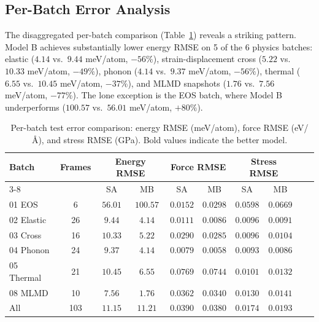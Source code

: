 \documentclass[twoside,prb,aps,floatfix,superscriptaddress,longbibliography]{revtex4-2}
\begin{document}
\subsection{Per-Batch Error Analysis}
\label{sec:perbatch}

The disaggregated per-batch comparison (Table~\ref{tab:perbatch}) reveals a striking pattern. Model B achieves substantially lower energy RMSE on 5 of the 6 physics batches: elastic ($4.14$ vs.\ $9.44$ meV/atom, $-56\%$), strain-displacement cross ($5.22$ vs.\ $10.33$ meV/atom, $-49\%$), phonon ($4.14$ vs.\ $9.37$ meV/atom, $-56\%$), thermal ($6.55$ vs.\ $10.45$ meV/atom, $-37\%$), and MLMD snapshots ($1.76$ vs.\ $7.56$ meV/atom, $-77\%$). The lone exception is the EOS batch, where Model B underperforms ($100.57$ vs.\ $56.01$ meV/atom, $+80\%$).

\begin{table}[t]
\caption{Per-batch test error comparison: energy RMSE (meV/atom), force RMSE (eV/{\AA}), and stress RMSE (GPa). Bold values indicate the better model.}
\label{tab:perbatch}
\begin{ruledtabular}
\begin{tabular}{lccccccccc}
\toprule
Batch & \multirow{2}{*}{Frames} & \multicolumn{2}{c}{Energy RMSE} & \multicolumn{2}{c}{Force RMSE} & \multicolumn{2}{c}{Stress RMSE} \\
\cmidrule{3-8}
& & SA & MB & SA & MB & SA & MB \\
\midrule
01 EOS & 6 & $56.01$ & $100.57$ & $0.0152$ & $0.0298$ & $0.0598$ & $0.0669$ \\
02 Elastic & 26 & $9.44$ & $\mathbf{4.14}$ & $0.0111$ & $\mathbf{0.0086}$ & $\mathbf{0.0096}$ & $0.0091$ \\
03 Cross & 16 & $10.33$ & $\mathbf{5.22}$ & $0.0290$ & $\mathbf{0.0285}$ & $\mathbf{0.0096}$ & $0.0104$ \\
04 Phonon & 24 & $9.37$ & $\mathbf{4.14}$ & $0.0079$ & $\mathbf{0.0058}$ & $\mathbf{0.0093}$ & $0.0086$ \\
05 Thermal & 21 & $10.45$ & $\mathbf{6.55}$ & $0.0769$ & $\mathbf{0.0744}$ & $\mathbf{0.0101}$ & $0.0132$ \\
08 MLMD & 10 & $7.56$ & $\mathbf{1.76}$ & $0.0362$ & $\mathbf{0.0340}$ & $\mathbf{0.0130}$ & $0.0141$ \\
\midrule
All & 103 & $11.15$ & $11.21$ & $0.0390$ & $0.0380$ & $\mathbf{0.0174}$ & $0.0193$ \\
\bottomrule
\end{tabular}
\end{ruledtabular}
\end{table}
\end{document}
